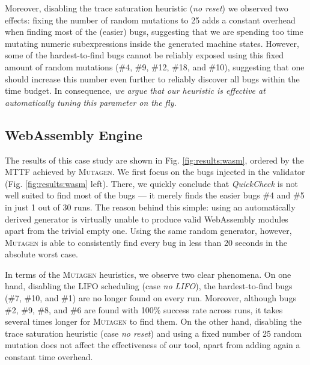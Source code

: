 \documentclass[sigconf,review,anonymous]{acmart}
\newcommand{\quickcheck}{\textit{QuickCheck}\xspace}
\newcommand{\mutagen}{\textsc{Mutagen}\xspace}
\begin{document}
Moreover, disabling the trace saturation heuristic (\textit{no reset}) we
observed two effects:
%
fixing the number of random mutations to 25 adds a constant overhead when
finding most of the (easier) bugs, suggesting that we are spending too time
mutating numeric subexpressions inside the generated machine states.
%
%
However, some of the hardest-to-find bugs cannot be reliably exposed using this
fixed amount of random mutations (\#4, \#9, \#12, \#18, and \#10), suggesting
that one should increase this number even further to reliably discover all bugs
within the time budget.
%
In consequence, \emph{we argue that our heuristic is effective at automatically
tuning this parameter on the fly}.
%


\subsection{WebAssembly Engine}

The results of this case study are shown in Fig. \ref{fig:results:wasm}, ordered
by the MTTF achieved by \mutagen.
%
We first focus on the bugs injected in the validator (Fig.
\ref{fig:results:wasm} left).
%
There, we quickly conclude that \quickcheck is not well suited to find most of
the bugs --- it merely finds the easier bugs \#4 and \#5 in just 1 out of 30
runs.
%
The reason behind this simple:
%
%
using an automatically derived generator is virtually unable to produce valid
WebAssembly modules apart from the trivial empty one.
%
Using the same random generator, however, \mutagen is able to consistently find
every bug in less than 20 seconds in the absolute worst case.


In terms of the \mutagen heuristics, we observe two clear phenomena.
%
On one hand, disabling the LIFO scheduling (case \textit{no LIFO}), the
hardest-to-find bugs (\#7, \#10, and \#1) are no longer found on every run.
%
Moreover, although bugs \#2, \#9, \#8, and \#6 are found with 100\% success rate
across runs, it takes several times longer for \mutagen to find them.
%
On the other hand, disabling the trace saturation heuristic (case \textit{no
  reset}) and using a fixed number of 25 random mutation does not affect the
effectiveness of our tool, apart from adding again a constant time overhead.
\end{document}
